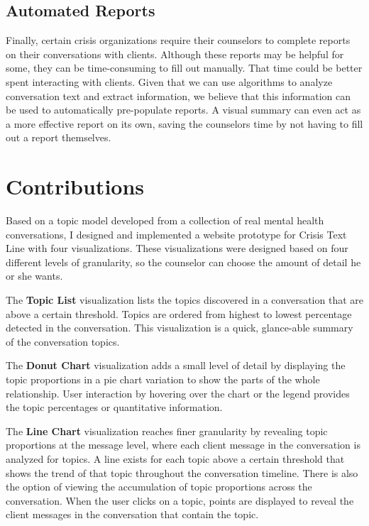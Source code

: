 \subsection{Automated Reports}

Finally, certain crisis organizations require their counselors to complete reports on
their conversations with clients. Although these reports may be helpful for some,
they can be time-consuming to fill out manually. That time could be better spent
interacting with clients. Given that we can use algorithms to analyze conversation text
and extract information, we believe that this information can be used to automatically
pre-populate reports. A visual summary can even act as a more effective report on
its own, saving the counselors time by not having to fill out a report themselves.

\section{Contributions}

Based on a topic model developed from a collection of real mental health
conversations, I designed and implemented a website prototype for Crisis Text Line with four visualizations. These visualizations were designed based on four different levels of
granularity, so the counselor can choose the amount of detail he or she wants.

The \textbf{Topic List} visualization lists the topics discovered in a conversation that
are above a certain threshold. Topics are ordered from highest to lowest percentage
detected in the conversation. This visualization is a quick, glance-able summary of
the conversation topics.

The \textbf{Donut Chart} visualization adds a small level of detail by displaying the topic
proportions in a pie chart variation to show the parts of the whole relationship. User
interaction by hovering over the chart or the legend provides the topic percentages 
or quantitative information.

The \textbf{Line Chart} visualization reaches finer granularity by revealing topic
proportions at the message level, where each client message in the conversation is analyzed
for topics. A line exists for each topic above a certain threshold that shows the trend
of that topic throughout the conversation timeline. There is also the option of viewing
the accumulation of topic proportions across the conversation. When the user clicks
on a topic, points are displayed to reveal the client messages in the conversation that
contain the topic.

